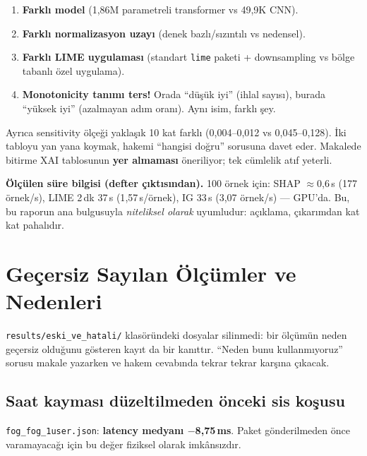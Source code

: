 \documentclass[11pt,a4paper]{report}
\newcommand{\ms}{\,ms}
\newcommand{\kod}[1]{\texttt{\small #1}}
\newcommand{\dosya}[1]{\texttt{\footnotesize #1}}
\begin{document}
\begin{uyari}
\begin{enumerate}[nosep,leftmargin=1.4em]
\item \textbf{Farklı model} (1{,}86M parametreli transformer vs 49{,}9K CNN).
\item \textbf{Farklı normalizasyon uzayı} (denek bazlı/sızıntılı vs nedensel).
\item \textbf{Farklı LIME uygulaması} (standart \kod{lime} paketi + downsampling
vs bölge tabanlı özel uygulama).
\item \textbf{Monotonicity tanımı ters!} Orada ``düşük iyi'' (ihlal sayısı),
burada ``yüksek iyi'' (azalmayan adım oranı). Aynı isim, farklı şey.
\end{enumerate}
Ayrıca sensitivity ölçeği yaklaşık 10 kat farklı (0{,}004--0{,}012 vs
0{,}045--0{,}128). İki tabloyu yan yana koymak, hakemi ``hangisi doğru''
sorusuna davet eder. Makalede bitirme XAI tablosunun \textbf{yer almaması}
öneriliyor; tek cümlelik atıf yeterli.
\end{uyari}

\textbf{Ölçülen süre bilgisi (defter çıktısından).} 100 örnek için: SHAP
$\approx$0{,}6\,s (177 örnek/s), LIME 2\,dk 37\,s (1{,}57\,s/örnek), IG 33\,s
(3{,}07 örnek/s) --- GPU'da. Bu, bu raporun ana bulgusuyla \emph{niteliksel
olarak} uyumludur: açıklama, çıkarımdan kat kat pahalıdır.

\chapter{Geçersiz Sayılan Ölçümler ve Nedenleri}

\dosya{results/eski\_ve\_hatali/} klasöründeki dosyalar silinmedi: bir ölçümün
neden geçersiz olduğunu gösteren kayıt da bir kanıttır. ``Neden bunu
kullanmıyoruz'' sorusu makale yazarken ve hakem cevabında tekrar tekrar
karşına çıkacak.

\section{Saat kayması düzeltilmeden önceki sis koşusu}

\dosya{fog\_fog\_1user.json}: \textbf{latency medyanı $-$8{,}75\ms}. Paket
gönderilmeden önce varamayacağı için bu değer fiziksel olarak imkânsızdır.
\end{document}
